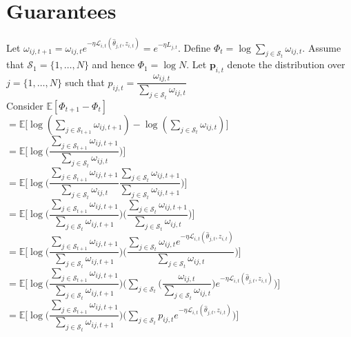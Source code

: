 \documentclass{article}
\theoremstyle{definition}
\begin{document}
    \section{Guarantees} \label{sec:guarantees}
    Let $\omega_{ij,t+1} = \omega_{ij,t}e^{-\eta\mathcal{L}_{i,t}(\hat{\theta}_{j,t},z_{i,t})} = e^{-\eta L_{j,t}}$. Define $\Phi_{t}=\log{\sum_{j\in\mathcal{S}_{t}}\omega_{ij,t}}$. Assume that $\mathcal{S}_{1}=\{1,\ldots,N\}$ and hence $\Phi_{1}=\log N$. Let $\bm{p}_{i,t}$ denote the distribution over $j=\{1,\ldots,N\}$ such that $p_{ij,t}=\dfrac{\omega_{ij,t}}{\sum_{j\in\mathcal{S}_{t}}\omega_{ij,t}}$\\
    Consider $\mathbb{E}[\Phi_{t+1}-\Phi_{t}]$\\
    $=\mathbb{E}\Big[\log(\sum_{j\in\mathcal{S}_{t+1}}\omega_{ij,t+1})-\log(\sum_{j\in\mathcal{S}_{t}}\omega_{ij,t})\Big]$\\
    $=\mathbb{E}\Bigg[\log\Bigg({\dfrac{\sum_{j\in\mathcal{S}_{t+1}}\omega_{ij,t+1}}{\sum_{j\in\mathcal{S}_{t}}\omega_{ij,t}}}\Bigg)\Bigg]$\\
    $=\mathbb{E}\Bigg[\log\Bigg({\dfrac{\sum_{j\in\mathcal{S}_{t+1}}\omega_{ij,t+1}}{\sum_{j\in\mathcal{S}_{t}}\omega_{ij,t}}\dfrac{\sum_{j\in\mathcal{S}_{t}}\omega_{ij,t+1}}{\sum_{j\in\mathcal{S}_{t}}\omega_{ij,t+1}}}\Bigg)\Bigg]$\\
    $=\mathbb{E}\Bigg[\log\Bigg({\dfrac{\sum_{j\in\mathcal{S}_{t+1}}\omega_{ij,t+1}}{\sum_{j\in\mathcal{S}_{t}}\omega_{ij,t+1}}}\Bigg)\Bigg(\dfrac{\sum_{j\in\mathcal{S}_{t}}\omega_{ij,t+1}}{\sum_{j\in\mathcal{S}_{t}}\omega_{ij,t}}\Bigg)\Bigg]$\\
    $=\mathbb{E}\Bigg[\log{\Bigg({\dfrac{\sum_{j\in\mathcal{S}_{t+1}}\omega_{ij,t+1}}{\sum_{j\in\mathcal{S}_{t}}\omega_{ij,t+1}}}\Bigg)\Bigg(\dfrac{\sum_{j\in\mathcal{S}_{t}}\omega_{ij,t}e^{-\eta\mathcal{L}_{i,t}(\hat{\theta}_{j,t},z_{i,t})}}{\sum_{j\in\mathcal{S}_{t}}\omega_{ij,t}}}\Bigg)\Bigg]$\\
    $=\mathbb{E}\Bigg[\log{\Bigg({\dfrac{\sum_{j\in\mathcal{S}_{t+1}}\omega_{ij,t+1}}{\sum_{j\in\mathcal{S}_{t}}\omega_{ij,t+1}}}\Bigg)\Bigg(\sum_{j\in\mathcal{S}_{t}}\Big(\dfrac{\omega_{ij,t}}{\sum_{j\in\mathcal{S}_{t}}\omega_{ij,t}}\Big)e^{-\eta\mathcal{L}_{i,t}(\hat{\theta}_{j,t},z_{i,t})}}\Bigg)\Bigg]$\\
    $=\mathbb{E}\Bigg[\log{\Bigg({\dfrac{\sum_{j\in\mathcal{S}_{t+1}}\omega_{ij,t+1}}{\sum_{j\in\mathcal{S}_{t}}\omega_{ij,t+1}}}\Bigg)\Bigg(\sum_{j\in\mathcal{S}_{t}}p_{ij,t}e^{-\eta\mathcal{L}_{i,t}(\hat{\theta}_{j,t},z_{i,t})}}\Bigg)\Bigg]$\\
\end{document}
